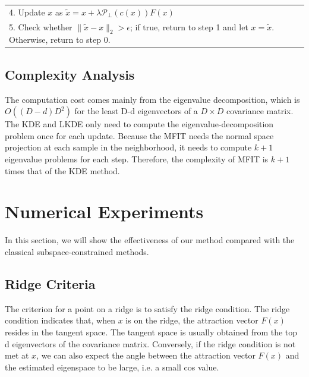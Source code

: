 \documentclass[aos,preprint]{imsart}
\theoremstyle{remark}
\begin{document}
\begin{table}[t]
{\begin{tabular}{l}
\hspace{1cm} 4. Update $x$ as $\tilde{x} = x + \lambda {\mathcal P}_{\perp}(c(x)) F(x)$\\ 
\hspace{1cm} 5. Check whether $\| \tilde{x} -x\|_2 > \epsilon$; if true, return to step 1 and let $x = \tilde{x}$. Otherwise, return to step 0.\\
\hline
\end{tabular}}
\label{algorithm}
\end{table}

\subsection{Complexity Analysis}
The computation cost comes mainly from the eigenvalue decomposition, which is $O((D-d)D^2)$ for the least D-d eigenvectors of a $D\times D$ covariance matrix. The KDE and LKDE only need to compute the eigenvalue-decomposition problem once for each update. Because the MFIT needs the normal space projection at each sample in the neighborhood, it needs to compute $k+1$ eigenvalue problems for each step. Therefore, the complexity of MFIT is $k+1$ times that of the KDE method.

\section{Numerical Experiments}
In this section, we will show the effectiveness of our method compared with the classical subspace-constrained methods.
\subsection{Ridge Criteria}
The criterion for a point on a ridge is to satisfy the ridge condition. The ridge condition indicates that, when $x$ is on the ridge, the attraction vector $F(x)$ resides in the tangent space. The tangent space is usually obtained from the top d eigenvectors of the covariance matrix. Conversely, if the ridge condition is not met at $x$, we can also expect the angle between the attraction vector $F(x)$ and the estimated eigenspace to be large, i.e. a small cos value. 
\end{document}
